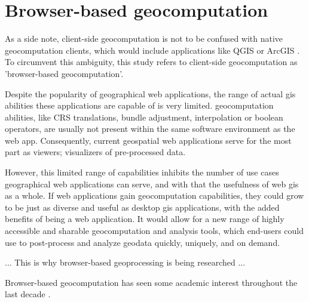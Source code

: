 
\section{Browser-based geocomputation}
\label{sec:related-geoweb}



As a side note, client-side geocomputation is not to be confused with native geocomputation clients, which would include applications like QGIS \cite{qgis_community_qgis_2022}or ArcGIS \cite{esri_arcgis_2022}.
To circumvent this ambiguity, this study refers to client-side geocomputation as 'browser-based geocomputation'.


Despite the popularity of geographical web applications, the range of actual \ac{gis} abilities these applications are capable of is very limited. \ac{geocomputation} abilities, like CRS translations, bundle adjustment, interpolation or boolean operators, are usually not present within the same software environment as the web app. Consequently, current geospatial web applications serve for the most part as viewers; visualizers of pre-processed data. 

However, this limited range of capabilities inhibits the number of use cases geographical web applications can serve, and with that the usefulness of web \ac{gis} as a whole.
If web applications gain \ac{geocomputation} capabilities, they could grow to be just as diverse and useful as desktop \ac{gis} applications, with the added benefits of being a web application. It would allow for a new range of highly accessible and sharable geocomputation and analysis tools, which end-users could use to post-process and analyze geodata quickly, uniquely, and on demand.

... This is why browser-based geoprocessing is being researched ...

Browser-based geocomputation has seen some academic interest throughout the last decade \cite{hamilton_client-side_2014, panidi_hybrid_2015, kulawiak_analysis_2019}.

